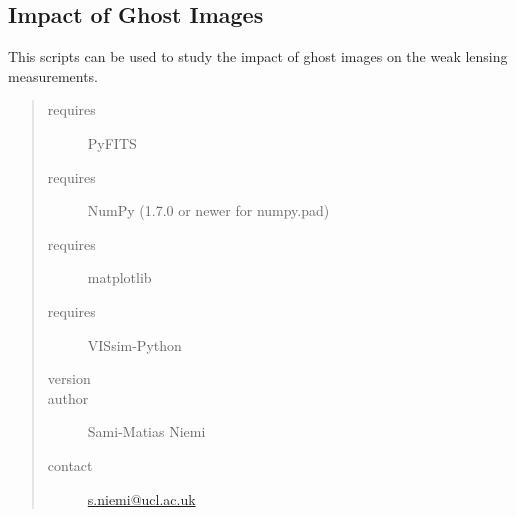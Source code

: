 \documentclass[a4paper,11pt,english]{sphinxmanual}
\begin{document}
\subsection{Impact of Ghost Images}
\label{reduction:impact-of-ghost-images}
This scripts can be used to study the impact of ghost images on the weak lensing measurements.
\begin{quote}\begin{description}
\item[{requires}] \leavevmode
PyFITS

\item[{requires}] \leavevmode
NumPy (1.7.0 or newer for numpy.pad)

\item[{requires}] \leavevmode
matplotlib

\item[{requires}] \leavevmode
VISsim-Python

\item[{version}] 

\item[{author}] \leavevmode
Sami-Matias Niemi

\item[{contact}] \leavevmode
\href{mailto:s.niemi@ucl.ac.uk}{s.niemi@ucl.ac.uk}

\end{description}\end{quote}
\end{document}
